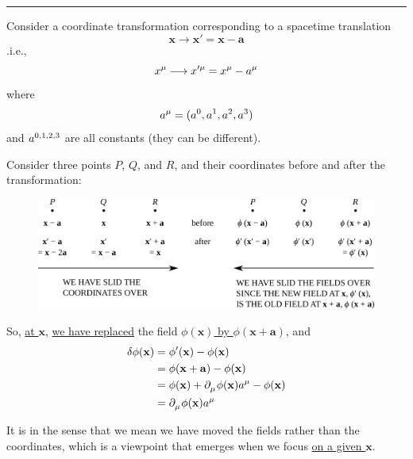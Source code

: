 \documentclass{article}
\begin{document}

\noindent\rule{\textwidth}{.5pt}

\noindent Consider a coordinate transformation corresponding to a spacetime translation
\begin{equation*}
    \mathbf{x} \longrightarrow \mathbf{x}' = \mathbf{x} - \mathbf{a}
\end{equation*}
.i.e.,
\begin{equation*}
    \tensor{x}{^\mu} \longrightarrow \tensor{x}{^\prime^\mu} = \tensor{x}{^\mu} - \tensor{a}{^\mu}
\end{equation*}
where
\begin{equation*}
    \tensor{a}{^\mu} = ( \tensor{a}{^0}, \tensor{a}{^1}, \tensor{a}{^2}, \tensor{a}{^3} )
\end{equation*}
and $\tensor{a}{^0^,^1^,^2^,^3}$ are all constants (they can be different).

\noindent Consider three points $P$, $Q$, and $R$, and their coordinates before and after the transformation:
\begin{figure}[h!]
    \centering
    \includegraphics[width=.99\textwidth]{pics/07-coordinate-transformation.pdf} %
    \label{fig:l7-coordinate-transformation}
\end{figure}

\newpage

\noindent So, \underline{at $\mathbf{x}$}, \underline{we have replaced} the field \underline{$\phi (\mathbf{x})$ by $\phi ( \mathbf{x} + \mathbf{a} )$}, and
\begin{align*}
    \delta \phi (\mathbf{x}) &= \phi' (\mathbf{x}) - \phi (\mathbf{x}) \\
    &= \phi ( \mathbf{x} + \mathbf{a} ) - \phi (\mathbf{x}) \\
    &= \phi (\mathbf{x}) + \tensor{\partial}{_\mu} \phi (\mathbf{x}) \tensor{a}{^\mu} - \phi (\mathbf{x}) \\
    &= \tensor{\partial}{_\mu} \phi (\mathbf{x}) \tensor{a}{^\mu}
\end{align*}

\noindent It is in the sense that we mean we have moved the fields rather than the coordinates, which is a viewpoint that emerges when we focus \underline{on a given $\mathbf{x}$}.
\end{document}

